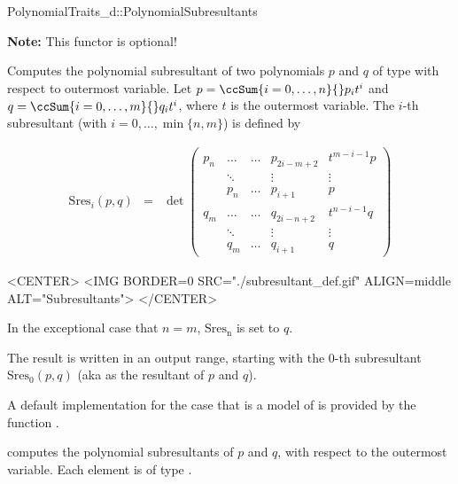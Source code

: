 \begin{ccRefConcept}{PolynomialTraits_d::PolynomialSubresultants}

\textbf{Note:} This functor is optional!

\ccDefinition

Computes the polynomial subresultant of two polynomials $p$ and $q$ of 
type  with respect to outermost variable.
Let 
$p=\ccSum{i=0,\ldots,n}{} p_i t^i$ and 
$q=\ccSum{i=0,\ldots,m}{} q_i t^i$, where $t$
is the outermost variable.
The $i$-th subresultant (with $i=0,\ldots,\min\{n,m\}$) is defined by

\begin{ccTexOnly}
\begin{eqnarray*}
\mathrm{Sres}_i(p,q)&=&\det \left(\begin{array}{cccccc}
p_n & \ldots &\ldots& p_{2i-m+2}&t^{m-i-1}p \\
&\ddots&&\vdots&\vdots\\
&p_n&\ldots&p_{i+1}&p\\
q_m & \ldots &\ldots & q_{2i-n+2}&t^{n-i-1}q \\
&\ddots&&\vdots&\vdots\\
&q_m&\ldots&q_{i+1}&q
\end{array}\right)
\end{eqnarray*}
\end{ccTexOnly}

\begin{ccHtmlOnly}
<CENTER>
<IMG BORDER=0 SRC="./subresultant_def.gif" ALIGN=middle ALT="Subresultants">
</CENTER>
\end{ccHtmlOnly}

In the exceptional case that $n=m$, $\mathrm{Sres_n}$ is set to $q$.

The result is written in an output range, starting with the $0$-th subresultant
$\mathrm{Sres}_0(p,q)$
(aka as the resultant of $p$ and $q$).

A default implementation for the case that 
is a model of 
is provided by the function .


\ccOperations
{}
         { computes the polynomial subresultants of $p$ and $q$, 
           with respect to the outermost variable. Each element is of type
           .}


\end{ccRefConcept}
